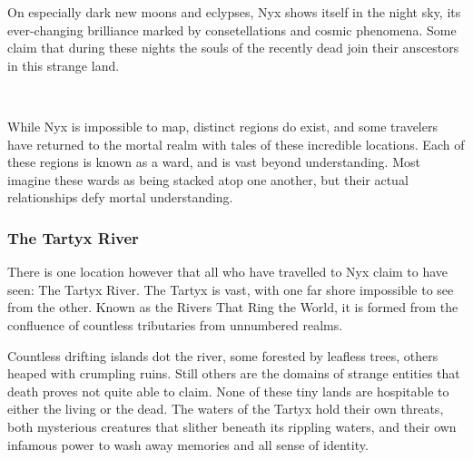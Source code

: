 On especially dark new moons and eclypses, Nyx shows itself in the night sky, its ever-changing brilliance marked by consetellations and cosmic phenomena.
Some claim that during these nights the souls of the recently dead join their anscestors in this strange land.

\pagebreak~
\vspace{13.0cm}

While Nyx is impossible to map, distinct regions do exist, and some travelers have returned to the mortal realm with tales of these incredible locations.
Each of these regions is known as a ward, and is vast beyond understanding.
Most imagine these wards as being stacked atop one another, but their actual relationships defy mortal understanding.

\subsubsection{The Tartyx River}
There is one location however that all who have travelled to Nyx claim to have seen: The Tartyx River.
The Tartyx is vast, with one far shore impossible to see from the other.
Known as the Rivers That Ring the World, it is formed from the confluence of countless tributaries from unnumbered realms.

Countless drifting islands dot the river, some forested by leafless trees, others heaped with crumpling ruins.
Still others are the domains of strange entities that death proves not quite able to claim.
None of these tiny lands are hospitable to either the living or the dead.
The waters of the Tartyx hold their own threats, both mysterious creatures that slither beneath its rippling waters, and their own infamous power to wash away memories and all sense of identity.
